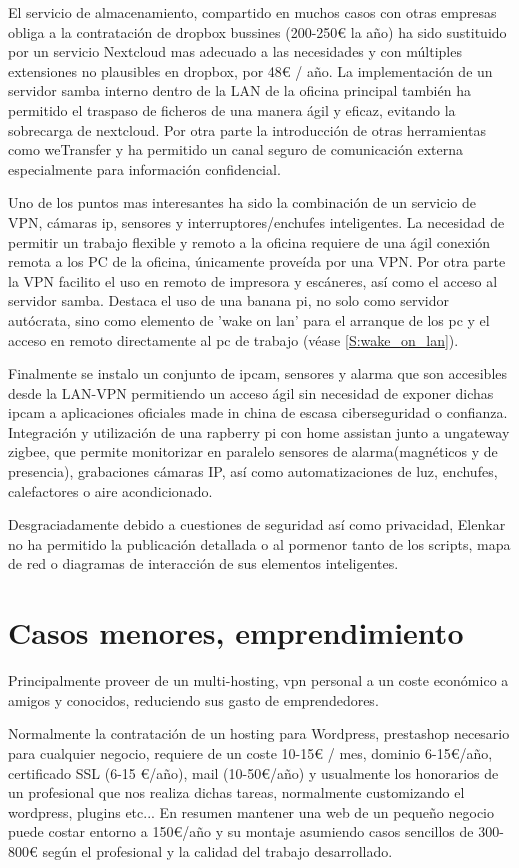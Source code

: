 El servicio de almacenamiento, compartido en muchos casos con otras empresas obliga a la contratación de dropbox bussines (200-250€ la año) ha sido sustituido por un servicio Nextcloud mas adecuado a las necesidades y con múltiples extensiones no plausibles en dropbox, por 48€ / año.
La implementación de un servidor samba interno dentro de la LAN de la oficina principal también ha permitido el traspaso de ficheros de una manera ágil y eficaz, evitando la sobrecarga de nextcloud. Por otra parte la introducción de otras herramientas como weTransfer\cite{c_we_transfer} y \cite{c_franz} ha permitido un canal seguro de comunicación externa especialmente para información confidencial.

Uno de los puntos mas interesantes ha sido la combinación de un servicio de VPN, cámaras ip, sensores y interruptores/enchufes inteligentes.
La necesidad de permitir un trabajo flexible y remoto a la oficina requiere de una ágil conexión remota a los PC de la oficina, únicamente proveída por una VPN. Por otra parte la VPN facilito el uso en remoto de impresora y escáneres, así como el acceso al servidor samba. Destaca el uso de una banana pi, no solo como servidor autócrata, sino como elemento de 'wake on lan' para el arranque de los pc y el acceso en remoto directamente al pc de trabajo (véase \ref{S:wake_on_lan}).

Finalmente se instalo un conjunto de ipcam, sensores y alarma que son accesibles desde la LAN-VPN permitiendo un acceso ágil sin necesidad de exponer dichas ipcam a aplicaciones oficiales made in china de escasa ciberseguridad o confianza. Integración y utilización de una rapberry pi con home assistan junto a ungateway zigbee, que permite monitorizar en paralelo sensores de alarma(magnéticos y de presencia), grabaciones cámaras IP, así como automatizaciones de luz, enchufes, calefactores o aire acondicionado.

Desgraciadamente debido a cuestiones de seguridad así como privacidad, Elenkar no ha permitido la publicación detallada o al pormenor tanto de los scripts, mapa de red o diagramas de interacción de sus elementos inteligentes.

\section{Casos menores, emprendimiento}
Principalmente proveer de un multi-hosting, vpn personal a un coste económico a amigos y conocidos, reduciendo sus gasto de emprendedores.

Normalmente la contratación de un hosting para Wordpress, prestashop necesario para cualquier negocio, requiere de un coste 10-15€ / mes, dominio 6-15€/año, certificado SSL (6-15 €/año), mail (10-50€/año) y usualmente los honorarios de un profesional que nos realiza dichas tareas, normalmente customizando el wordpress, plugins etc... En resumen mantener una web de un pequeño negocio puede costar entorno a 150€/año y su montaje asumiendo casos sencillos de 300-800€ según el profesional y la calidad del trabajo desarrollado.

